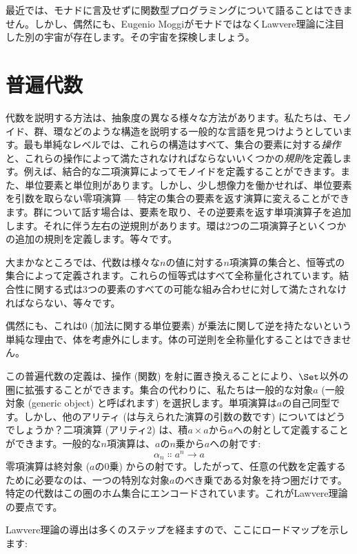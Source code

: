 
\lettrine[lhang=0.17]{最}{近}では、モナドに言及せずに関数型プログラミングについて語ることはできません。しかし、偶然にも、Eugenio MoggiがモナドではなくLawvere理論に注目した別の宇宙が存在します。その宇宙を探検しましょう。

\section{普遍代数}

代数を説明する方法は、抽象度の異なる様々な方法があります。私たちは、モノイド、群、環などのような構造を説明する一般的な言語を見つけようとしています。最も単純なレベルでは、これらの構造はすべて、集合の要素に対する\emph{操作}と、これらの操作によって満たされなければならないいくつかの\emph{規則}を定義します。例えば、結合的な二項演算によってモノイドを定義することができます。また、単位要素と単位則があります。しかし、少し想像力を働かせれば、単位要素を引数を取らない零項演算 --- 特定の集合の要素を返す演算に変えることができます。群について話す場合は、要素を取り、その逆要素を返す単項演算子を追加します。それに伴う左右の逆規則があります。環は2つの二項演算子といくつかの追加の規則を定義します。等々です。

大まかなところでは、代数は様々な$n$の値に対する$n$項演算の集合と、恒等式の集合によって定義されます。これらの恒等式はすべて全称量化されています。結合性に関する式は3つの要素のすべての可能な組み合わせに対して満たされなければならない、等々です。

偶然にも、これは0 (加法に関する単位要素) が乗法に関して逆を持たないという単純な理由で、体を考慮外にします。体の可逆則を全称量化することはできません。

この普遍代数の定義は、操作 (関数) を射に置き換えることにより、$\Set$以外の圏に拡張することができます。集合の代わりに、私たちは一般的な対象$a$ (一般対象 (generic object) と呼ばれます) を選択します。単項演算は$a$の自己同型です。しかし、他のアリティ (は与えられた演算の引数の数です) についてはどうでしょうか？二項演算 (アリティ2) は、積$a\times{}a$から$a$への射として定義することができます。一般的な$n$項演算は、$a$の$n$乗から$a$への射です: 
\[\alpha_n \Colon a^n \to a\]
零項演算は終対象 ($a$の0乗) からの射です。したがって、任意の代数を定義するために必要なのは、一つの特別な対象$a$のべき乗である対象を持つ圏だけです。特定の代数はこの圏のホム集合にエンコードされています。これがLawvere理論の要点です。

Lawvere理論の導出は多くのステップを経ますので、ここにロードマップを示します: 


